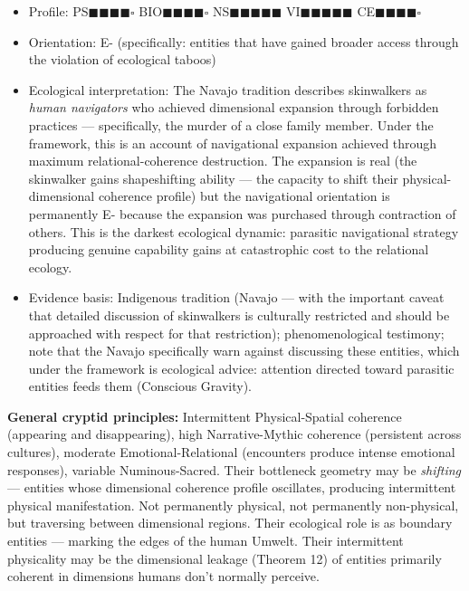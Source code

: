 \begin{itemize}[nosep,leftmargin=*]
  \item Profile: PS$\blacksquare$$\blacksquare$$\blacksquare$$\blacksquare$$\square$ BIO$\blacksquare$$\blacksquare$$\blacksquare$$\blacksquare$$\square$ NS$\blacksquare$$\blacksquare$$\blacksquare$$\blacksquare$$\blacksquare$ VI$\blacksquare$$\blacksquare$$\blacksquare$$\blacksquare$$\blacksquare$ CE$\blacksquare$$\blacksquare$$\blacksquare$$\blacksquare$$\square$
  \item Orientation: E- (specifically: entities that have gained broader access through the violation of ecological taboos)
  \item Ecological interpretation: The Navajo tradition describes skinwalkers as \textit{human navigators} who achieved dimensional expansion through forbidden practices — specifically, the murder of a close family member. Under the framework, this is an account of navigational expansion achieved through maximum relational-coherence destruction. The expansion is real (the skinwalker gains shapeshifting ability — the capacity to shift their physical-dimensional coherence profile) but the navigational orientation is permanently E- because the expansion was purchased through contraction of others. This is the darkest ecological dynamic: parasitic navigational strategy producing genuine capability gains at catastrophic cost to the relational ecology.
  \item Evidence basis: Indigenous tradition (Navajo — with the important caveat that detailed discussion of skinwalkers is culturally restricted and should be approached with respect for that restriction); phenomenological testimony; note that the Navajo specifically warn against discussing these entities, which under the framework is ecological advice: attention directed toward parasitic entities feeds them (Conscious Gravity).
\end{itemize}


\textbf{General cryptid principles:} Intermittent Physical-Spatial coherence (appearing and disappearing), high Narrative-Mythic coherence (persistent across cultures), moderate Emotional-Relational (encounters produce intense emotional responses), variable Numinous-Sacred. Their bottleneck geometry may be \textit{shifting} — entities whose dimensional coherence profile oscillates, producing intermittent physical manifestation. Not permanently physical, not permanently non-physical, but traversing between dimensional regions. Their ecological role is as boundary entities — marking the edges of the human Umwelt. Their intermittent physicality may be the dimensional leakage (Theorem 12) of entities primarily coherent in dimensions humans don't normally perceive.

